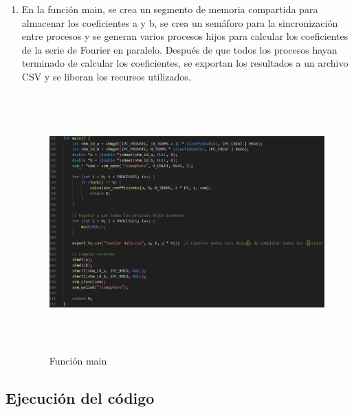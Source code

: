 \begin{enumerate}
	\item En la función main, se crea un segmento de memoria compartida para almacenar los coeficientes a y b, se crea un semáforo para la sincronización entre procesos y se generan varios procesos hijos para calcular los coeficientes de la serie de Fourier en paralelo. Después de que todos los procesos hayan terminado de calcular los coeficientes, se exportan los resultados a un archivo CSV y se liberan los recursos utilizados.
	
	\begin{figure}[H]
		\centering
		\includegraphics[width=6.26772in,height=3.90278in]{media/image7.png}
		\caption{Función main}
	\end{figure}
	
\end{enumerate}

\subsection{Ejecución del código}

